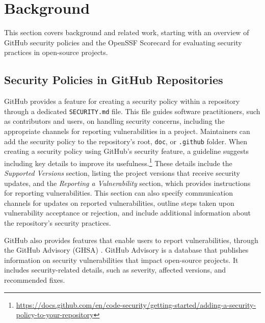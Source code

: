  \section{Background}
\label{2_background}




This section covers background and related work, starting with an overview of GitHub security policies and the OpenSSF Scorecard for evaluating security practices in open-source projects.

\subsection{Security Policies in GitHub Repositories}
GitHub provides a feature for creating a security policy within a repository through a dedicated \texttt{SECURITY.md} file. This file guides software practitioners, such as contributors and users, on handling security concerns, including the appropriate channels for reporting vulnerabilities in a project. Maintainers can add the security policy to the repository’s root, \texttt{doc}, or \texttt{.github} folder. When creating a security policy using GitHub’s security feature, a guideline suggests including key details to improve its usefulness.\footnote{\url{https://docs.github.com/en/code-security/getting-started/adding-a-security-policy-to-your-repository}} These details include the \textit{Supported Versions} section, listing the project versions that receive security updates, and the \textit{Reporting a Vulnerability} section, which provides instructions for reporting vulnerabilities. This section can also specify communication channels for updates on reported vulnerabilities, outline steps taken upon vulnerability acceptance or rejection, and include additional information about the repository’s security practices. 

GitHub also provides features that enable users to report vulnerabilities, through the GitHub Advisory (GHSA) \cite{GitHubAdvisoryDatabase:online}. GitHub Advisory is a database that publishes information on security vulnerabilities that impact open-source projects. It includes security-related details, such as severity, affected versions, and recommended fixes.


